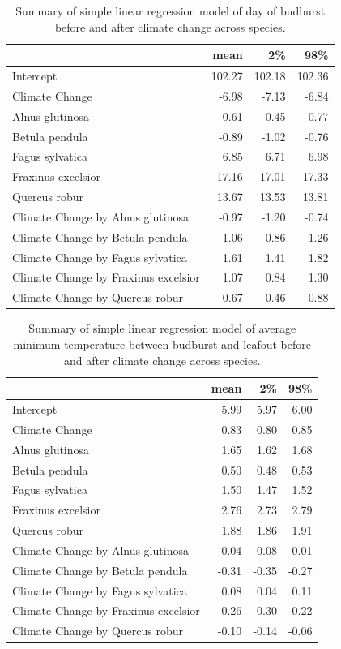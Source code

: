 \documentclass{article}\usepackage[]{graphicx}\usepackage[]{color}
\begin{document}
\begin{table}[H]
\centering
\caption{Summary of simple linear regression model of day of budburst before and after climate change across species.} 
\begin{tabular}{lrrr}
  \hline
 & mean & 2\% & 98\% \\ 
  \hline
Intercept & 102.27 & 102.18 & 102.36 \\ 
  Climate Change & -6.98 & -7.13 & -6.84 \\ 
  Alnus glutinosa & 0.61 & 0.45 & 0.77 \\ 
  Betula pendula & -0.89 & -1.02 & -0.76 \\ 
  Fagus sylvatica & 6.85 & 6.71 & 6.98 \\ 
  Fraxinus excelsior & 17.16 & 17.01 & 17.33 \\ 
  Quercus robur & 13.67 & 13.53 & 13.81 \\ 
  Climate Change by Alnus glutinosa & -0.97 & -1.20 & -0.74 \\ 
  Climate Change by Betula pendula & 1.06 & 0.86 & 1.26 \\ 
  Climate Change by Fagus sylvatica & 1.61 & 1.41 & 1.82 \\ 
  Climate Change by Fraxinus excelsior & 1.07 & 0.84 & 1.30 \\ 
  Climate Change by Quercus robur & 0.67 & 0.46 & 0.88 \\ 
   \hline
\end{tabular}
\end{table}
\begin{table}[H]
\centering
\caption{Summary of simple linear regression model of average minimum temperature between budburst and leafout before and after climate change across species.} 
\begin{tabular}{lrrr}
  \hline
 & mean & 2\% & 98\% \\ 
  \hline
Intercept & 5.99 & 5.97 & 6.00 \\ 
  Climate Change & 0.83 & 0.80 & 0.85 \\ 
  Alnus glutinosa & 1.65 & 1.62 & 1.68 \\ 
  Betula pendula & 0.50 & 0.48 & 0.53 \\ 
  Fagus sylvatica & 1.50 & 1.47 & 1.52 \\ 
  Fraxinus excelsior & 2.76 & 2.73 & 2.79 \\ 
  Quercus robur & 1.88 & 1.86 & 1.91 \\ 
  Climate Change by Alnus glutinosa & -0.04 & -0.08 & 0.01 \\ 
  Climate Change by Betula pendula & -0.31 & -0.35 & -0.27 \\ 
  Climate Change by Fagus sylvatica & 0.08 & 0.04 & 0.11 \\ 
  Climate Change by Fraxinus excelsior & -0.26 & -0.30 & -0.22 \\ 
  Climate Change by Quercus robur & -0.10 & -0.14 & -0.06 \\ 
   \hline
\end{tabular}
\end{table}
\end{document}
